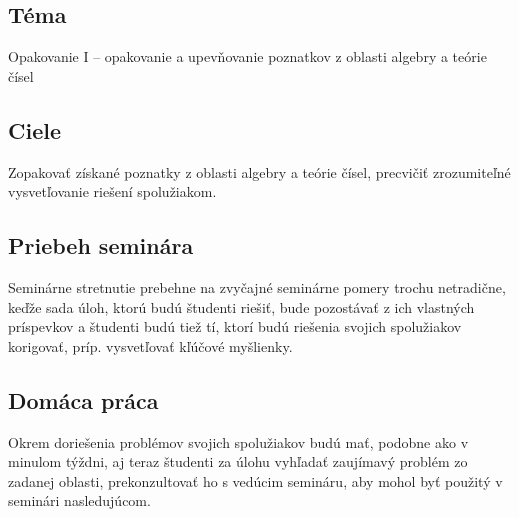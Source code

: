 

\subsection*{Téma}
Opakovanie I -- opakovanie a upevňovanie poznatkov z oblasti algebry a teórie čísel
\subsection*{Ciele}
Zopakovať získané poznatky z oblasti algebry a teórie čísel, precvičiť zrozumiteľné vysvetľovanie riešení spolužiakom.

\subsection*{Priebeh seminára}
Seminárne stretnutie prebehne na zvyčajné seminárne pomery trochu netradične, keďže sada úloh, ktorú budú študenti riešiť, bude pozostávať z ich vlastných príspevkov a študenti budú tiež tí, ktorí budú riešenia svojich spolužiakov korigovať, príp. vysvetľovať kľúčové myšlienky.

\subsection*{Domáca práca}
Okrem doriešenia problémov svojich spolužiakov budú mať, podobne ako v minulom týždni, aj teraz študenti za úlohu vyhľadať zaujímavý problém zo zadanej oblasti, prekonzultovať ho s vedúcim semináru, aby mohol byť použitý v seminári nasledujúcom.
